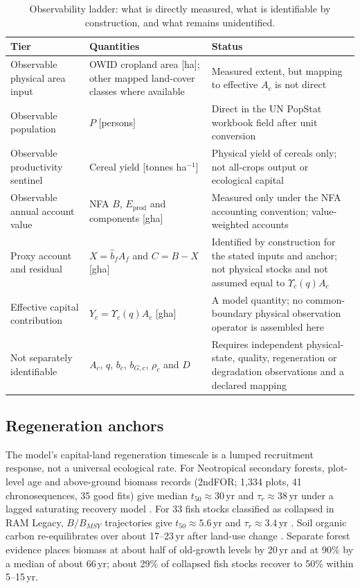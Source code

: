 \documentclass[11pt,a4paper]{article}
\newcommand{\Ups}{\Upsilon_c}
\begin{document}
\begin{table}[htbp]
\centering\small
\caption{Observability ladder: what is directly measured, what is identifiable by construction, and what remains unidentified.}
\label{tab:si_ladder}
\begin{tabularx}{\textwidth}{>{\raggedright\arraybackslash}p{} X >{\raggedright\arraybackslash}p{}}
\toprule
Tier & Quantities & Status \\
\midrule
Observable physical area input & OWID cropland area [ha]; other mapped land-cover classes where available & Measured extent, but mapping to effective $A_c$ is not direct \\
Observable population & $P$ [persons] & Direct in the UN PopStat workbook field after unit conversion \\
Observable productivity sentinel & Cereal yield [tonnes ha$^{-1}$] & Physical yield of cereals only; not all-crops output or ecological capital \\
Observable annual account value & NFA $B$, $E_{\mathrm{prod}}$ and components [gha] & Measured only under the NFA accounting convention; value-weighted accounts \\
Proxy account and residual & $X=\hat b_fA_f$ and $C=B-X$ [gha] & Identified by construction for the stated inputs and anchor; not physical stocks and not assumed equal to $\Ups(q)A_c$ \\
Effective capital contribution & $Y_c=\Ups(q)A_c$ [gha] & A model quantity; no common-boundary physical observation operator is assembled here \\
Not separately identifiable & $A_c$, $q$, $b_c$, $b_{G,c}$, $\rho_c$ and $D$ & Requires independent physical-state, quality, regeneration or degradation observations and a declared mapping \\
\bottomrule
\end{tabularx}
\end{table}

\subsection{Regeneration anchors}\label{si:anchors}

The model's capital-land regeneration timescale is a lumped recruitment response, not a universal ecological rate. For Neotropical secondary forests, plot-level age and above-ground biomass records (2ndFOR; 1,334 plots, 41 chronosequences, 35 good fits) give median $t_{50}\approx30$\,yr and $\tau_r\approx38$\,yr under a lagged saturating recovery model \citep{Poorter2016}. For 33 fish stocks classified as collapsed in RAM Legacy, $B/B_{MSY}$ trajectories give $t_{50}\approx5.6$\,yr and $\tau_r\approx3.4$\,yr \citep{HutchingsReynolds2004,Neubauer2013}. Soil organic carbon re-equilibrates over about 17--23\,yr after land-use change \citep{Poeplau2011}. Separate forest evidence places biomass at about half of old-growth levels by 20\,yr and at 90\% by a median of about 66\,yr; about 29\% of collapsed fish stocks recover to 50\% within 5--15\,yr.
\end{document}

